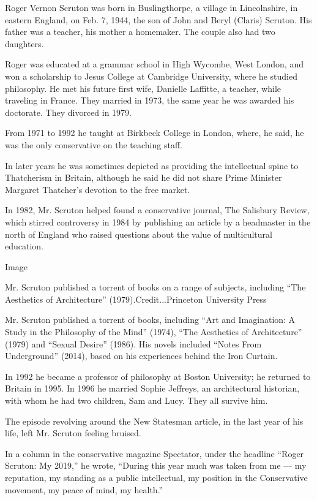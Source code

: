 Roger Vernon Scruton was born in Buslingthorpe, a village in
Lincolnshire, in eastern England, on Feb. 7, 1944, the son of John and
Beryl (Claris) Scruton. His father was a teacher, his mother a
homemaker. The couple also had two daughters.

Roger was educated at a grammar school in High Wycombe, West London, and
won a scholarship to Jesus College at Cambridge University, where he
studied philosophy. He met his future first wife, Danielle Laffitte, a
teacher, while traveling in France. They married in 1973, the same year
he was awarded his doctorate. They divorced in 1979.

From 1971 to 1992 he taught at Birkbeck College in London, where, he
said, he was the only conservative on the teaching staff.

In later years he was sometimes depicted as providing the intellectual
spine to Thatcherism in Britain, although he said he did not share Prime
Minister Margaret Thatcher's devotion to the free market.

In 1982, Mr. Scruton helped found a conservative journal, The Salisbury
Review, which stirred controversy in 1984 by publishing an article by a
headmaster in the north of England who raised questions about the value
of multicultural education.

Image

Mr. Scruton published a torrent of books on a range of subjects,
including ``The Aesthetics of Architecture'' (1979).Credit...Princeton
University Press

Mr. Scruton published a torrent of books, including ``Art and
Imagination: A Study in the Philosophy of the Mind'' (1974), ``The
Aesthetics of Architecture'' (1979) and ``Sexual Desire'' (1986). His
novels included ``Notes From Underground'' (2014), based on his
experiences behind the Iron Curtain.

In 1992 he became a professor of philosophy at Boston University; he
returned to Britain in 1995. In 1996 he married Sophie Jeffreys, an
architectural historian, with whom he had two children, Sam and Lucy.
They all survive him.

The episode revolving around the New Statesman article, in the last year
of his life, left Mr. Scruton feeling bruised.

In a column in the conservative magazine Spectator, under the headline
``Roger Scruton: My 2019,'' he wrote, ``During this year much was taken
from me --- my reputation, my standing as a public intellectual, my
position in the Conservative movement, my peace of mind, my health.''

